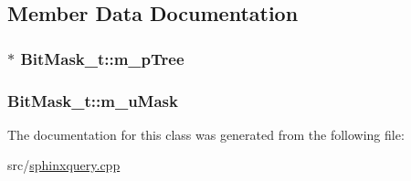 \subsection{Member Data Documentation}
\hypertarget{classBitMask__t_acabe03f2c298ac78de1e7c3ce431d5ce}{
\subsubsection[{m\-\_\-p\-Tree}]{$\ast$ Bit\-Mask\-\_\-t\-::m\-\_\-p\-Tree\hspace{0.3cm}{\ttfamily [private]}}}\label{classBitMask__t_acabe03f2c298ac78de1e7c3ce431d5ce}
\hypertarget{classBitMask__t_a07f6c0dbee52d7084a4ae6e295d1e45d}{
\subsubsection[{m\-\_\-u\-Mask}]{ Bit\-Mask\-\_\-t\-::m\-\_\-u\-Mask\hspace{0.3cm}{\ttfamily [private]}}}\label{classBitMask__t_a07f6c0dbee52d7084a4ae6e295d1e45d}


The documentation for this class was generated from the following file\-:\begin{DoxyCompactItemize}
\item 
src/\hyperlink{sphinxquery_8cpp}{sphinxquery.\-cpp}\end{DoxyCompactItemize}
